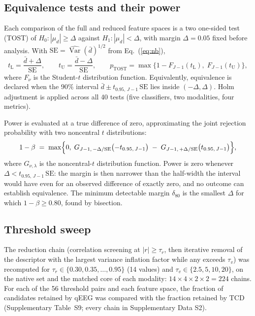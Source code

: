 \documentclass[10pt,a4paper]{article}
\begin{document}
\subsection{Equivalence tests and their power}

Each comparison of the full and reduced feature spaces is a two one-sided test
(TOST) of $H_0\colon|\mu_d| \ge \Delta$ against $H_1\colon|\mu_d| < \Delta$,
with margin $\Delta = 0.05$ fixed before analysis. With
$\mathrm{SE} = \widehat{\operatorname{Var}}(\bar d)^{1/2}$ from
Eq.~(\ref{eq:nb}),
\begin{equation}
t_{\mathrm{L}} = \frac{\bar d + \Delta}{\mathrm{SE}}, \qquad
t_{\mathrm{U}} = \frac{\bar d - \Delta}{\mathrm{SE}}, \qquad
p_{\mathrm{TOST}} = \max\bigl\{1 - F_{J-1}(t_{\mathrm{L}}),\; F_{J-1}(t_{\mathrm{U}})\bigr\},
\end{equation}
where $F_{\nu}$ is the Student-$t$ distribution function. Equivalently,
equivalence is declared when the $90\%$ interval
$\bar d \pm t_{0.95,\,J-1}\,\mathrm{SE}$ lies inside $(-\Delta, \Delta)$.
Holm adjustment is applied across all 40 tests (five classifiers, two
modalities, four metrics).

Power is evaluated at a true difference of zero, approximating the joint
rejection probability with two noncentral $t$ distributions:
\begin{equation}
1-\beta \;=\; \max\Bigl\{0,\; G_{J-1,\,-\Delta/\mathrm{SE}}\bigl(-t_{0.95,\,J-1}\bigr)
\;-\; G_{J-1,\,+\Delta/\mathrm{SE}}\bigl(t_{0.95,\,J-1}\bigr)\Bigr\},
\end{equation}
where $G_{\nu,\lambda}$ is the noncentral-$t$ distribution function. Power is
zero whenever $\Delta < t_{0.95,\,J-1}\,\mathrm{SE}$: the margin is then
narrower than the half-width the interval would have even for an observed
difference of exactly zero, and no outcome can establish equivalence. The
minimum detectable margin $\delta_{80}$ is the smallest $\Delta$ for which
$1-\beta \ge 0.80$, found by bisection.

\subsection{Threshold sweep}

The reduction chain (correlation screening at $|r| \ge \tau_r$, then
iterative removal of the descriptor with the largest variance inflation factor
while any exceeds $\tau_v$) was recomputed for $\tau_r \in \{0.30, 0.35,
\dots, 0.95\}$ (14 values) and $\tau_v \in \{2.5, 5, 10, 20\}$, on the native
set and the matched core of each modality: $14 \times 4 \times 2 \times 2 =
224$ chains. For each of the 56 threshold pairs and each feature space, the
fraction of candidates retained by qEEG was compared with the fraction retained
by TCD (Supplementary Table~S9; every chain in Supplementary Data S2).
\end{document}
